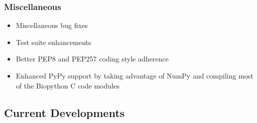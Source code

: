 \documentclass[trans]{beamer}
\begin{document}
\frame
{
  \frametitle{Miscellaneous}

  \begin{itemize}
  \item Miscellaneous bug fixes
  \item Test suite enhancements
  \item Better PEP8 and PEP257 coding style adherence
  \item Enhanced PyPy support by taking
advantage of NumPy and compiling most of the Biopython C code modules
  \end{itemize}
}


\subsection*{Current Developments}
\frame
{
}
\end{document}
